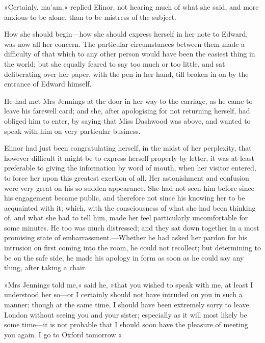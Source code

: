 »Certainly, ma’am,« replied Elinor, not hearing much of what she said, and more anxious to be alone, than to be mistress of the subject.

How she should begin—how she should express herself in her note to Edward, was now all her concern. The particular circumstances between them made a difficulty of that which to any other person would have been the easiest thing in the world; but she equally feared to say too much or too little, and sat deliberating over her paper, with the pen in her hand, till broken in on by the entrance of Edward himself.

He had met Mrs Jennings at the door in her way to the carriage, as he came to leave his farewell card; and she, after apologising for not returning herself, had obliged him to enter, by saying that Miss Dashwood was above, and wanted to speak with him on very particular business.

Elinor had just been congratulating herself, in the midst of her perplexity, that however difficult it might be to express herself properly by letter, it was at least preferable to giving the information by word of mouth, when her visitor entered, to force her upon this greatest exertion of all. Her astonishment and confusion were very great on his so sudden appearance. She had not seen him before since his engagement became public, and therefore not since his knowing her to be acquainted with it; which, with the consciousness of what she had been thinking of, and what she had to tell him, made her feel particularly uncomfortable for some minutes. He too was much distressed; and they sat down together in a most promising state of embarrassment.—Whether he had asked her pardon for his intrusion on first coming into the room, he could not recollect; but determining to be on the safe side, he made his apology in form as soon as he could say any thing, after taking a chair.

»Mrs Jennings told me,« said he, »that you wished to speak with me, at least I understood her so—or I certainly should not have intruded on you in such a manner; though at the same time, I should have been extremely sorry to leave London without seeing you and your sister; especially as it will most likely be some time—it is not probable that I should soon have the pleasure of meeting you again. I go to Oxford tomorrow.«

